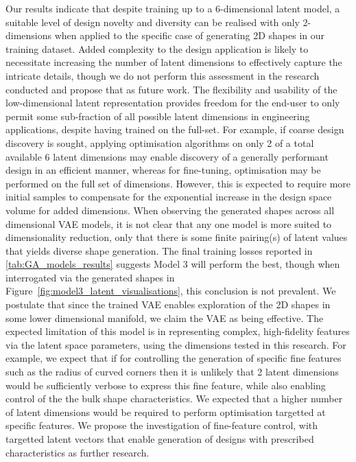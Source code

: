 \documentclass{article}
\begin{document}
Our results indicate that despite training up to a 6-dimensional latent model, a suitable level of design novelty and diversity can be realised with only 2-dimensions when applied to the specific case of generating 2D shapes in our training dataset. Added complexity to the design application is likely to necessitate increasing the number of latent dimensions to effectively capture the intricate details, though we do not perform this assessment in the research conducted and propose that as future work. The flexibility and usability of the low-dimensional latent representation provides freedom for the end-user to only permit some sub-fraction of all possible latent dimensions in engineering applications, despite having trained on the full-set. For example, if coarse design discovery is sought, applying optimisation algorithms on only 2 of a total available 6 latent dimensions may enable discovery of a generally performant design in an efficient manner, whereas for fine-tuning, optimisation may be performed on the full set of dimensions. However, this is expected to require more initial samples to compensate for the exponential increase in the design space volume for added dimensions. When observing the generated shapes across all dimensional VAE models, it is not clear that any one model is more suited to dimensionality reduction, only that there is some finite pairing(s) of latent values that yields diverse shape generation. The final training losses reported in \ref{tab:GA_models_results} suggests Model 3 will perform the best, though when interrogated via the generated shapes in Figure~\ref{fig:model3_latent_visualisations}, this conclusion is not prevalent. We postulate that since the trained VAE enables exploration of the 2D shapes in some lower dimensional manifold, we claim the VAE as being effective. The expected limitation of this model is in representing complex, high-fidelity features via the latent space parameters, using the dimensions tested in this research. For example, we expect that if for controlling the generation of specific fine features such as the radius of curved corners then it is unlikely that 2 latent dimensions would be sufficiently verbose to express this fine feature, while also enabling control of the the bulk shape characteristics. We expected that a higher number of latent dimensions would be required to perform optimisation targetted at specific features. We propose the investigation of fine-feature control, with targetted latent vectors that enable generation of designs with prescribed characteristics as further research.
\end{document}
